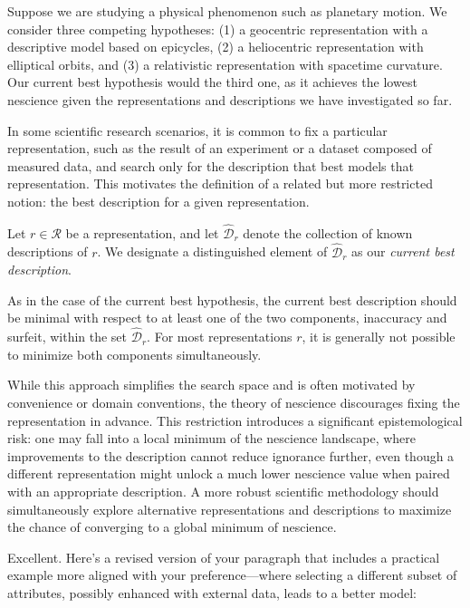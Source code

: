 \begin{example}
Suppose we are studying a physical phenomenon such as planetary motion. We consider three competing hypotheses: (1) a geocentric representation with a descriptive model based on epicycles, (2) a heliocentric representation with elliptical orbits, and (3) a relativistic representation with spacetime curvature. Our current best hypothesis would the third one, as it achieves the lowest nescience given the representations and descriptions we have investigated so far.
\end{example}

In some scientific research scenarios, it is common to fix a particular representation, such as the result of an experiment or a dataset composed of measured data, and search only for the description that best models that representation. This motivates the definition of a related but more restricted notion: the best description for a given representation.

\begin{definition}
Let $r \in \mathcal{R}$ be a representation, and let $\hat{\mathcal{D}}_r$ denote the collection of known descriptions of $r$. We designate a distinguished element of $\hat{\mathcal{D}}_r$ as our \emph{current best description}.
\end{definition}

As in the case of the current best hypothesis, the current best description should be minimal with respect to at least one of the two components, inaccuracy and surfeit, within the set $\hat{\mathcal{D}}_r$. For most representations $r$, it is generally not possible to minimize both components simultaneously.

While this approach simplifies the search space and is often motivated by convenience or domain conventions, the theory of nescience discourages fixing the representation in advance. This restriction introduces a significant epistemological risk: one may fall into a local minimum of the nescience landscape, where improvements to the description cannot reduce ignorance further, even though a different representation might unlock a much lower nescience value when paired with an appropriate description. A more robust scientific methodology should simultaneously explore alternative representations and descriptions to maximize the chance of converging to a global minimum of nescience.

Excellent. Here's a revised version of your paragraph that includes a practical example more aligned with your preference—where selecting a different subset of attributes, possibly enhanced with external data, leads to a better model:

